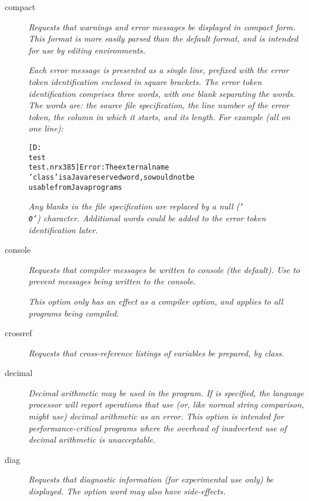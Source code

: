\begin{description}
\item[compact]

\emph{Requests that warnings and error messages be displayed in compact
form.  This format is more easily parsed than the default format, and
is intended for use by editing environments.}
 
\emph{Each error message is presented as a single line, prefixed with the
error token identification enclosed in square brackets.
The error token identification comprises three words, with one blank
separating the words.  The words are: the source file specification, the
line number of the error token, the column in which it starts, and its
length.  For example (all on one line):}
\begin{alltt}
[D:\\test\\test.nrx 3 8 5] Error: The external name
'class' is a Java reserved word, so would not be
usable from Java programs
\end{alltt}
\emph{Any blanks in the file specification are replaced by a null
(\texttt{'\\0'}) character.  Additional words could be added to the error
token identification later.}
\item[console]

\emph{Requests that compiler messages be written to console (the default).
Use  to prevent messages being written to the
console.}
 
\emph{This option only has an effect as a compiler option, and applies to all
programs being compiled.}
\item[crossref]
\emph{Requests that cross-reference listings of variables be prepared,
by class.}
\item[decimal]

\emph{Decimal arithmetic may be used in the program.  If  is
specified, the language processor will report operations that use (or,
like normal string comparison, might use) decimal arithmetic as an
error.  This option is intended for performance-critical programs where
the overhead of inadvertent use of decimal arithmetic is
unacceptable.}
\item[diag]
\emph{Requests that diagnostic information (for experimental use only)
be displayed.
The  option word may also have side-effects.}


\end{description}
